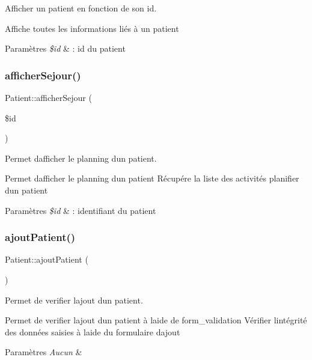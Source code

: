 Afficher un patient en fonction de son id. 

Affiche toutes les informations liés à un patient 
\begin{DoxyParams}{Paramètres}
{\em \$id} & \+: id du patient \\
\hline
\end{DoxyParams}
\mbox{\label{class_patient_a5714c582c9b7e3afa2109a1633f271b1}} 
\subsubsection{\texorpdfstring{afficher\+Sejour()}{afficherSejour()}}
{\footnotesize\ttfamily Patient\+::afficher\+Sejour (\begin{DoxyParamCaption}\item[{}]{\$id }\end{DoxyParamCaption})}



Permet d\textquotesingle{}afficher le planning d\textquotesingle{}un patient. 

Permet d\textquotesingle{}afficher le planning d\textquotesingle{}un patient Récupére la liste des activités planifier d\textquotesingle{}un patient 
\begin{DoxyParams}{Paramètres}
{\em \$id} & \+: identifiant du patient \\
\hline
\end{DoxyParams}
\mbox{\label{class_patient_aa09ce2b06c4bfaaf967ecc57f385e81a}} 
\subsubsection{\texorpdfstring{ajout\+Patient()}{ajoutPatient()}}
{\footnotesize\ttfamily Patient\+::ajout\+Patient (\begin{DoxyParamCaption}{ }\end{DoxyParamCaption})}



Permet de verifier l\textquotesingle{}ajout d\textquotesingle{}un patient. 

Permet de verifier l\textquotesingle{}ajout d\textquotesingle{}un patient à l\textquotesingle{}aide de form\+\_\+validation Vérifier l\textquotesingle{}intégrité des données saisies à l\textquotesingle{}aide du formulaire d\textquotesingle{}ajout 
\begin{DoxyParams}{Paramètres}
{\em Aucun} & \\
\hline
\end{DoxyParams}
\mbox{\label{class_patient_af8fd309485d3f8e985acdf0ce5ab2dcd}} 
